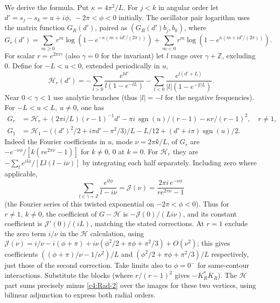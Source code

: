 We derive the formula. Put \(\kappa=4\pi^2/L\). For \(j<k\) in angular order let \(d'=s_j-s_k=u+i\phi,\ -2\pi<\phi<0\) initially. The oscillator pair logarithm uses the matrix function \(G_R(d')\), paired as \((G_R(d')b_j,b_k)\), where
\[
 G_r(d')=\sum_{m\ge0}r^m\log(1-e^{-\kappa(m+i d'/(2\pi))})
          +\sum_{m<0}r^m\log(1-e^{\kappa(m+i d'/(2\pi))}).
\]
For scalar \(r=e^{2\pi i\gamma}\) (also \(\gamma=0\) for the invariant) let \(l\) range over \(\gamma+\mathbb Z\), excluding 0. Define for \(-L<u<0\), extended periodically in \(u\),
\[
 \mathcal H_r(d')=-\sum_{l>0}\frac{e^{l d'}}{l(1-e^{-lL})}
                -\sum_{l<0}\frac{e^{l(d'+L)}}{|l|(1-e^{-|l|L})}.
\]
Near \(0<\gamma<1\) use analytic branches (thus \(|l|=-l\) for the negative frequencies). For \(-L<u<L,\ u\ne0\), one has
\[
 \begin{aligned}
 G_r&=\mathcal H_r + (2\pi i/L)(r-1)^{-1}d'
           -\pi i\,\operatorname{sgn}(u)/(r-1)-\kappa r/(r-1)^2,\quad r\ne1,\\
 G_1&=\mathcal H_1-\big((d')^2/2+i\pi d'-\pi^2/3\big)/L
                     -L/12+(d'+i\pi)\operatorname{sgn}(u)/2.
 \end{aligned}
\]
Indeed the Fourier coefficients in \(u\), mode \(\nu=2\pi k/L\), of \(G_r\) are \(-e^{-\nu\phi}/[k(r e^{2\pi\nu}-1)]\) for \(k\ne0\), 0 at \(k=0\). For \(\mathcal H_r\) they are \(-\sum_l e^{il\phi}/[L l(l-i\nu)]\) by integrating each half separately. Including zero where applicable,
\[
 \sum_{l\in\gamma+\mathbb Z} \frac{e^{il\phi}}{l-i\nu}
 =\mathcal J(\nu)=\frac{2\pi i\,e^{-\nu\phi}}{r e^{2\pi\nu}-1}
\]
(the Fourier series of this twisted exponential on \(-2\pi<\phi<0\)). Thus for \(r\ne1,\ k\ne0\), the coefficient of \(G-\mathcal H\) is \(-\mathcal J(0)/(L i\nu)\), and its constant coefficient is \(\mathcal J'(0)/(iL)\), matching the stated corrections. At \(r=1\) exclude the zero term \(i/\nu\) in the \(\mathcal H\) calculation, using
\(\mathcal J(\nu)=i/\nu-i(\phi+\pi)+i\nu(\phi^2/2+\pi\phi+\pi^2/3)+O(\nu^2)\); this gives coefficients \(((\phi+\pi)/\nu-1/\nu^2)/L\) and \((\phi^2/2+\pi\phi+\pi^2/3)/L\) respectively, just those of the second correction. Take limits also to \(\phi=0^-\) for same-contour interactions. Substitute the blocks (where \(r/(r-1)^2\) gives \(-K_R^*K_R\)). The \(\mathcal H\) part sums precisely minus \eqref{c4:Rad-2} over the images for these two vertices, using bilinear adjunction to express both radial orders.

